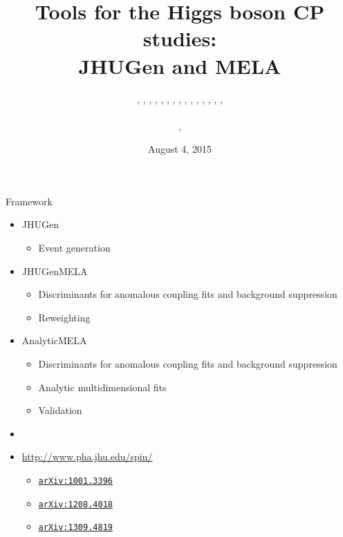 \documentclass[usenames,dvipsnames,svgnames,table]{beamer}
\title[JHUGen and MELA]{Tools for the Higgs boson CP studies: \\ JHUGen and MELA}
\author[Heshy Roskes]{\CMS{I.~Anderson}, \CMS{S.~Bolognesi}, \theory{F.~Caola}, \ATLAS{Y.~Gao}, \CMS{A.~Gritsan}, \CMS{Z.~Guo}, \CMS{C.~Martin}, \theory{K.~Melnikov}, \me{H.~Roskes}, \CMS{U.~Sarica}, \theory{M.~Schulze}, \CMS{N.~Tran}, \CMS{A.~Whitbeck}, \CMS{M.~Xiao}, \CMS{C.~You}, \theory{Y.~Zhou}
\texorpdfstring{\\ \leavevmode
\\
\theory{Theory}, \experiment{experiment}}{}}
\date{August 4, 2015}
\newcommand{\arxiv}[1]{\href{http://arxiv.org/abs/#1}{\nolinkurl{arXiv:#1}}}
\begin{document}
\begin{frame}
\titlepage
\end{frame}

\begin{frame}{Framework}

\begin{itemize}
\small
\item JHUGen
\begin{itemize}
\item Event generation
\end{itemize}
\item JHUGenMELA
\begin{itemize}
\item Discriminants for anomalous coupling fits and background suppression
\item Reweighting
\end{itemize}
\item AnalyticMELA
\begin{itemize}
\item Discriminants for anomalous coupling fits and background suppression
\item Analytic multidimensional fits
\item Validation
\end{itemize}
\item
\item \url{http://www.pha.jhu.edu/spin/}
\begin{itemize}
\item \arxiv{1001.3396}
\item \arxiv{1208.4018}
\item \arxiv{1309.4819}
\end{itemize}
\end{itemize}

\end{frame}
\end{document}
